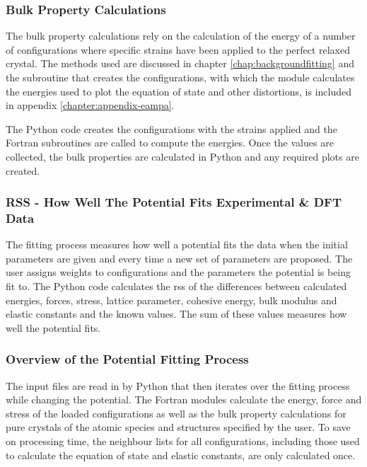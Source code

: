 \subsubsection{Bulk Property Calculations}

The bulk property calculations rely on the calculation of the energy of a number of configurations where specific strains have been applied to the perfect relaxed crystal.  The methods used are discussed in chapter \ref{chap:backgroundfitting} and the subroutine that creates the configurations, with which the module calculates the energies used to plot the equation of state and other distortions, is included in appendix \ref{chapter:appendix-eampa}.

The Python code creates the configurations with the strains applied and the Fortran subroutines are called to compute the energies.  Once the values are collected, the bulk properties are calculated in Python and any required plots are created.


\subsubsection{RSS - How Well The Potential Fits Experimental \& DFT Data}

The fitting process measures how well a potential fits the data when the initial parameters are given and every time a new set of parameters are proposed.  The user assigns weights to configurations and the parameters the potential is being fit to.  The Python code calculates the \acrfull{rss} of the differences between calculated energies, forces, stress, lattice parameter, cohesive energy, bulk modulus and elastic constants and the known values.  The sum of these values measures how well the potential fits.





\subsubsection{Overview of the Potential Fitting Process}

The input files are read in by Python that then iterates over the fitting process while changing the potential.  The Fortran modules calculate the energy, force and stress of the loaded configurations as well as the bulk property calculations for pure crystals of the atomic species and structures specified by the user.  To save on processing time, the neighbour lists for all configurations, including those used to calculate the equation of state and elastic constants, are only calculated once. 


